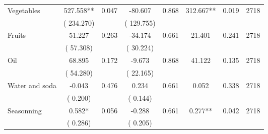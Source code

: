 \begin{tabular}{l*{7}{c}}
 Vegetables       &            527.558**       &        0.047  &            -80.607       &        0.868  &            312.667**       &              0.019 &  2718 \\ 
                       &       (     234.270)             &                               &       (     129.755)                     &                               &                                               &                                &                      \\ 

 Fruits       &             51.227       &        0.263  &            -34.174       &        0.661  &             21.401       &              0.241 &  2718 \\ 
                       &       (      57.308)             &                               &       (      30.224)                     &                               &                                               &                                &                      \\ 

 Oil       &             68.895       &        0.172  &             -9.673       &        0.868  &             41.122       &              0.135 &  2718 \\ 
                       &       (      54.280)             &                               &       (      22.165)                     &                               &                                               &                                &                      \\ 

 Water and soda       &             -0.043       &        0.476  &              0.234       &        0.661  &              0.052       &              0.338 &  2718 \\ 
                       &       (       0.200)             &                               &       (       0.144)                     &                               &                                               &                                &                      \\ 

 Seasonning       &              0.582*       &        0.056  &             -0.288       &        0.661  &              0.277**       &              0.042 &  2718 \\ 
                       &       (       0.286)             &                               &       (       0.205)                     &                               &                                               &                                &                      \\ 


\end{tabular}
